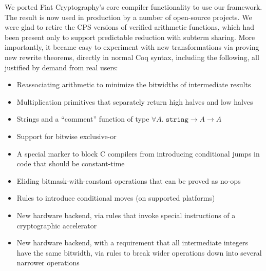 \documentclass[sn-mathphys,pdflatex]{sn-jnl}%
\theoremstyle{thmstyleone}%
\theoremstyle{thmstyletwo}%
\theoremstyle{thmstylethree}%
\begin{document}
We ported Fiat Cryptography's core compiler functionality to use our framework.
The result is now used in production by a number of open-source projects.
We were glad to retire the CPS versions of verified arithmetic functions, which had been present only to support predictable reduction with subterm sharing.
More importantly, it became easy to experiment with new transformations via proving new rewrite theorems, directly in normal Coq syntax, including the following, all justified by demand from real users:
\begin{itemize}
\item Reassociating arithmetic to minimize the bitwidths of intermediate results
\item Multiplication primitives that separately return high halves and low halves
\item Strings and a ``comment'' function of type $\forall A. \; \texttt{string} \to A \to A$
\item Support for bitwise exclusive-or
\item A special marker to block C compilers from introducing conditional jumps in code that should be constant-time
\item Eliding bitmask-with-constant operations that can be proved as no-ops
\item Rules to introduce conditional moves (on supported platforms)
\item New hardware backend, via rules that invoke special instructions of a cryptographic accelerator
\item New hardware backend, with a requirement that all intermediate integers have the same bitwidth, via rules to break wider operations down into several narrower operations
\end{itemize}

\end{document}
